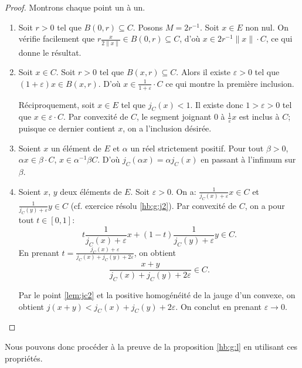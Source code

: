 \begin{proof}
  Montrons chaque point un à un.
  \begin{enumerate}
  \item Soit $r>0$ tel que $B(0, r)\subseteq C$. Posons
    $M = 2r^{-1}$. Soit $x\in E$ non nul. On vérifie facilement
    que $r\frac{x}{2\|x\|}\in B(0, r)\subseteq C$, d'où $x \in
    2r^{-1}\|x\|\cdot C$, ce qui donne le résultat.
  \item Soit $x\in C$. Soit $r> 0$ tel que $B(x, r)\subseteq C$.
    Alors il existe $\varepsilon >0$ tel que $(1+\varepsilon)x\in
    B(x, r)$. D'où $x\in \frac{1}{1+\varepsilon}\cdot C$ ce qui
    montre la première inclusion.

    Réciproquement, soit $x\in E$ tel que $j_C(x)<1$. Il existe
    donc $1 > \varepsilon > 0$ tel que $x\in \varepsilon \cdot C$.
    Par convexité de $C$, le segment joignant $0$ à
    $\frac{1}{\varepsilon}x$ est inclus à $C$; puisque
    ce dernier contient $x$, on a l'inclusion désirée.
  \item Soient $x$ un élément de $E$ et $\alpha$ un réel strictement
    positif. Pour tout $\beta > 0$, $\alpha x\in \beta\cdot C$, \ssi{}
    $x\in \alpha^{-1}\beta C$. D'où $j_C(\alpha x) = \alpha j_C(x)$ en
    passant à l'infimum sur $\beta$.
  \item Soient $x$, $y$  deux éléments de $E$. Soit
    $\varepsilon>0$. On a:%
    $\frac{1}{j_C(x)+\varepsilon}x\in C$ et
    $\frac{1}{j_C(y)+\varepsilon}y\in C$ (cf. exercice résolu \ref{hb:g:j2}).
    Par convexité de $C$, on a pour tout $t\in [0, 1]$:
    $$t\frac{1}{j_C(x)+\varepsilon}x +
    (1-t)\frac{1}{j_C(y)+\varepsilon}y\in C.$$
    En prenant $\displaystyle{t = \frac{j_C(x)+\varepsilon}
      {j_C(x) +j_C(y)+2\varepsilon}}$, on obtient
    $$\frac{x+y}{j_C(x) +j_C(y)+2\varepsilon}\in C. $$

    Par le point \ref{lem:jc2} et la positive homogénéité de la jauge d'un convexe,
    on obtient $j(x + y) < j_C(x)+j_C(y)+2\varepsilon$. On conclut
    en prenant $\varepsilon \to 0$.
  \end{enumerate}
\end{proof}

Nous pouvons donc procéder à la preuve de la proposition \ref{hb:g:l}
en utilisant ces propriétés.

